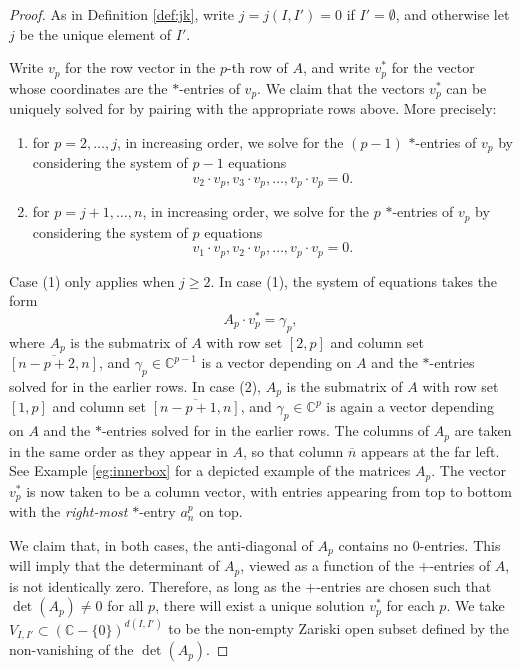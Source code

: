 \documentclass[12pt]{amsart}
\newcommand{\bC}{\mathbb{C}}
\newcommand{\barn}{\overline{n}}
\begin{document}
\begin{proof}
As in Definition \ref{def:jk}, write $j=j(I,I')=0$ if $I'=\emptyset$, and otherwise let $j$ be the unique element of $I'$.

Write $v_p$ for the row vector in the $p$-th row of $A$, and write $v_p^{*}$ for the vector whose coordinates are the $*$-entries of $v_p$. We claim that the vectors $v_p^{*}$ can be uniquely solved for by pairing with the appropriate rows above. More precisely:
\begin{enumerate}
    \item[(1)] for $p=2,\ldots,j$, in increasing order, we solve for the $(p-1)$ $*$-entries of $v_p$ by considering the system of $p-1$ equations
    \begin{equation*}
        v_2\cdot v_p, v_3\cdot v_p,\ldots,v_p\cdot v_p=0.
    \end{equation*}
    \item[(2)] for $p=j+1,\ldots,n$, in increasing order, we solve for the $p$ $*$-entries of $v_p$ by considering the system of $p$ equations
    \begin{equation*}
        v_1\cdot v_p, v_2\cdot v_p,\ldots,v_p\cdot v_p=0.
    \end{equation*}
\end{enumerate}
Case (1) only applies when $j\ge2$. In case (1), the system of equations takes the form
\begin{equation*}
    A_p\cdot v_p^{*}=\gamma_p,
\end{equation*}
where $A_p$ is the submatrix of $A$ with row set $[2,p]$ and column set $\overline{[n-p+2,n]}$, and $\gamma_p\in\bC^{p-1}$ is a vector depending on $A$ and the $*$-entries solved for in the earlier rows. In case (2), $A_p$ is the submatrix of $A$ with row set $[1,p]$ and column set $\overline{[n-p+1,n]}$, and $\gamma_p\in\bC^{p}$ is again a vector depending on $A$ and the $*$-entries solved for in the earlier rows. The columns of $A_p$ are taken in the same order as they appear in $A$, so that column $\barn$ appears at the far left. See Example \ref{eg:innerbox} for a depicted example of the matrices $A_p$. The vector $v_p^{*}$ is now taken to be a column vector, with entries appearing from top to bottom with the \emph{right-most} $*$-entry $a^p_n$ on top.

We claim that, in both cases, the anti-diagonal of $A_p$ contains no 0-entries. This will imply that the determinant of $A_p$, viewed as a function of the $+$-entries of $A$, is not identically zero. Therefore, as long as the $+$-entries are chosen such that $\det(A_p)\neq0$ for all $p$, there will exist a unique solution $v_p^{*}$ for each $p$. We take $V_{I,I'}\subset (\bC-\{0\})^{d(I,I')}$ to be the non-empty Zariski open subset defined by the non-vanishing of the $\det(A_p)$.


\end{proof}
\end{document}
